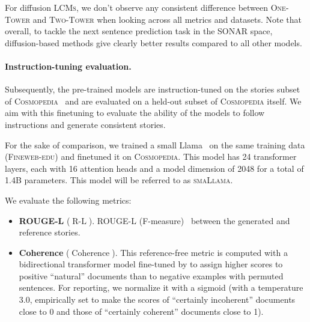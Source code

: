 \documentclass[twoside,11pt]{fairmeta}
\newcommand{\sllama}{\textsc{smaLlama}\xspace}
\newcommand{\lcms}{\textsc{LCMs}\xspace}
\newcommand{\twotower}{\textsc{Two-Tower}\xspace}
\newcommand{\interleaved}{\textsc{One-Tower}\xspace}
\DeclareMathOperator{\rougel}{R-L}
\DeclareMathOperator{\coherence}{Coherence}
\newcommand{\fineweb}{\textsc{Fineweb-edu}\xspace}
\newcommand{\cosmopedia}{\textsc{Cosmopedia}\xspace}
\begin{document}
For diffusion \lcms, we don't observe any consistent difference between \interleaved and \twotower when looking across all metrics and datasets. 
Note that overall, to tackle the next sentence prediction task in the SONAR space, diffusion-based methods give clearly better results compared to all other models.







\paragraph{Instruction-tuning evaluation.}
Subsequently, the pre-trained models are instruction-tuned on the stories subset of \cosmopedia~\citep{cosmopedia} and are evaluated on a held-out subset of \cosmopedia itself. We aim with this finetuning to evaluate the ability of the models to follow instructions and generate consistent stories. 

For the sake of comparison, we trained a small Llama~\citep{touvron2023llama} on the same training data (\fineweb) and finetuned it on \cosmopedia.
This model has 24 transformer layers, each with 16 attention heads and a model dimension of 2048 for a total of 1.4B parameters. This model will be referred to as \sllama.

We evaluate the following metrics:
\begin{itemize}[style=unboxed, leftmargin=*]
    \item \textbf{ROUGE-L} ($\rougel$). ROUGE-L (F-measure)~\citep{lin2004rouge} between the generated and reference stories.
    \item \textbf{Coherence} ($\coherence$). This reference-free metric is computed with a bidirectional transformer model fine-tuned by \citet{jwalapuram-etal-2022-rethinking} to assign higher scores to positive ``natural'' documents than to negative examples with permuted sentences. For reporting, we normalize it with a sigmoid (with a temperature 3.0, empirically set to make the scores of ``certainly incoherent'' documents close to 0 and those of ``certainly coherent'' documents close to 1). 
\end{itemize}
\end{document}
